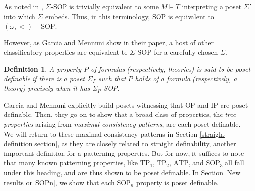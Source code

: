 \documentclass[10pt,a4paper]{amsart}
\newcommand{\TP}{\text{TP}}
\newcommand{\SOP}{\text{SOP}}
\newtheorem{definition}{Definition}
\begin{document}


As noted in \cite{garcia2022model}, $\Sigma$-SOP is trivially equivalent to some $M\models T$ interpreting a poset $\Sigma'$ into which $\Sigma$ embeds. Thus, in this terminology, $\SOP$ is equivalent to $(\omega, <)-\SOP$.




However, as Garcia and Mennuni show in their paper, a host of other classificatory properties are equivalent to $\Sigma$-SOP for a carefully-chosen $\Sigma$. 

\begin{definition}\label{poset definable defn}
 A property $P$ of formulas (respectively, theories) is said to be \textit{poset definable} if there is a poset $\Sigma_P$ such that $P$ holds of a formula (respectively, a theory) precisely when it has $\Sigma_P$-SOP. 
\end{definition}

Garcia and Mennuni explicitly build posets witnessing that OP and IP are poset definable. Then, they go on to show that a broad class of properties, the \textit{tree properties} arising from \textit{maximal consistency patterns}, are each poset definable. We will return to these maximal consistency patterns in Section \ref{straight definition section}, as they are closely related to straight definability, another important definition for a patterning properties. But for now, it suffices to note that many known patterning properties, like $\TP_1$, $\TP_2$, $\text{ATP}$, and $\SOP_3$ all fall under this heading, and are thus shown to be poset definable. In Section \ref{New results on SOPn}, we show that each $\mathrm{SOP}_n$  property is poset definable.
\end{document}
